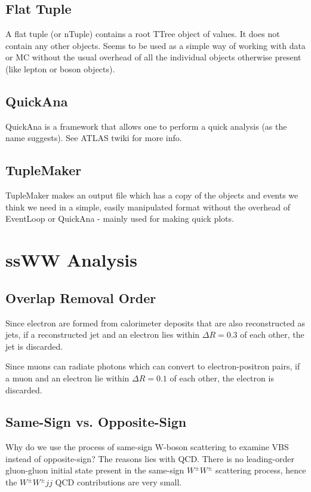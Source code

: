 \documentclass{article}
\begin{document}
\subsection{Flat Tuple}
A flat tuple (or nTuple) contains a root TTree object of values. It does not contain any other objects. Seems to be used as a simple way of working with data or MC without the usual overhead of all the individual objects otherwise present (like lepton or boson objects).

\subsection{QuickAna}
QuickAna is a framework that allows one to perform a quick analysis (as the name suggests). See ATLAS twiki for more info.

\subsection{TupleMaker}
TupleMaker makes an output file which has a copy of the objects and events we think we need in a simple, easily manipulated format without the overhead of EventLoop or QuickAna - mainly used for making quick plots.

\section{ssWW Analysis}

\subsection{Overlap Removal Order}
Since electron are formed from calorimeter deposits that are also reconstructed as jets, if a reconstructed jet and an electron lies within $\Delta R = 0.3$ of each other, the jet is discarded.

Since muons can radiate photons which can convert to electron-positron pairs, if a muon and an electron lie within $ \Delta R = 0.1$ of each other, the electron is discarded.

\subsection{Same-Sign vs. Opposite-Sign}
Why do we use the process of same-sign W-boson scattering to examine VBS instead of opposite-sign? The reasons lies with QCD. There is no leading-order gluon-gluon initial state present in the same-sign $W^{\pm}W^{\pm}$ scattering process, hence the $W^{\pm}W^{\pm}jj$ QCD contributions are very small.
\end{document}
